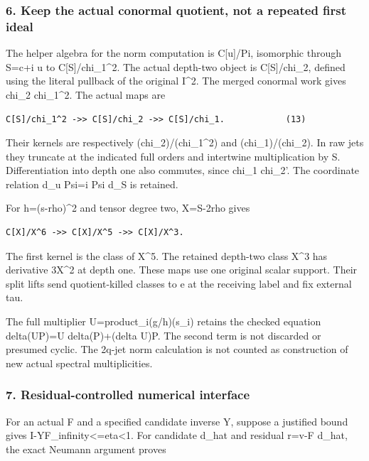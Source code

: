 \subsubsection{6. Keep the actual conormal quotient, not a repeated first ideal}\label{endpoint-pr24_original--keep-the-actual-conormal-quotient-not-a-repeated-first-ideal}

The helper algebra for the norm computation is C{[}u{]}/Pi, isomorphic through S=c+i u to C{[}S{]}/chi\_1\^{}2. The actual depth-two object is C{[}S{]}/chi\_2, defined using the literal pullback of the original I\^{}2. The merged conormal work gives chi\_2 \textbar{} chi\_1\^{}2. The actual maps are

\begin{verbatim}
C[S]/chi_1^2 ->> C[S]/chi_2 ->> C[S]/chi_1.            (13)
\end{verbatim}

Their kernels are respectively (chi\_2)/(chi\_1\^{}2) and (chi\_1)/(chi\_2). In raw jets they truncate at the indicated full orders and intertwine multiplication by S. Differentiation into depth one also commutes, since chi\_1 \textbar{} chi\_2'. The coordinate relation d\_u Psi=i Psi d\_S is retained.

For h=(s-rho)\^{}2 and tensor degree two, X=S-2rho gives

\begin{verbatim}
C[X]/X^6 ->> C[X]/X^5 ->> C[X]/X^3.
\end{verbatim}

The first kernel is the class of X\^{}5. The retained depth-two class X\^{}3 has derivative 3X\^{}2 at depth one. These maps use one original scalar support. Their split lifts send quotient-killed classes to e at the receiving label and fix external tau.

The full multiplier U=product\_i(g/h)(s\_i) retains the checked equation delta(UP)=U delta(P)+(delta U)P. The second term is not discarded or presumed cyclic. The 2q-jet norm calculation is not counted as construction of new actual spectral multiplicities.

\subsubsection{7. Residual-controlled numerical interface}\label{endpoint-pr24_original--residual-controlled-numerical-interface}

For an actual F and a specified candidate inverse Y, suppose a justified bound gives \textbar\textbar I-YF\textbar\textbar\_infinity\textless=eta\textless1. For candidate d\_hat and residual r=v-F d\_hat, the exact Neumann argument proves

